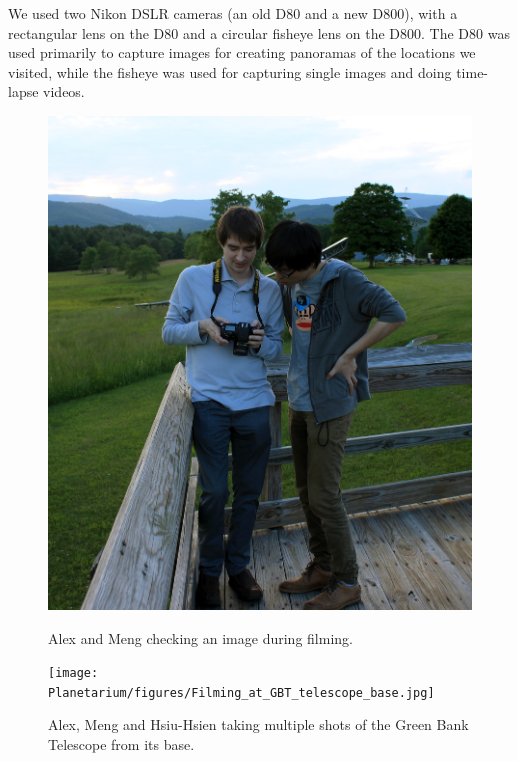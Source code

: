 We used two Nikon DSLR cameras (an old D80 and a new D800), with a rectangular lens on the D80 and a circular fisheye lens on the D800. The D80 was used primarily to capture images for creating panoramas of the locations we visited, while the fisheye was used for capturing single images and doing time-lapse videos. 

\begin{figure}[htb]
\centering
\begin{minipage}[b]{0.39\textwidth}
\centering
\includegraphics[width=0.95\linewidth]{Planetarium/figures/Filming_at_GBT_obs_deck.jpg}
\caption{Alex and Meng checking an image during filming.}
\label{Fig:GBT_obs_deck_film}
\end{minipage}%
\begin{minipage}[b]{0.02\textwidth}
\hspace{1cm}
\end{minipage}%
\begin{minipage}[b]{0.55\textwidth}
\centering
\texttt{[image: Planetarium/figures/Filming\_at\_GBT\_telescope\_base.jpg]}
\caption{Alex, Meng and Hsiu-Hsien taking multiple shots of the Green Bank Telescope from its base.}
\label{Fig:GBT_base_film}
\end{minipage}
\end{figure}

